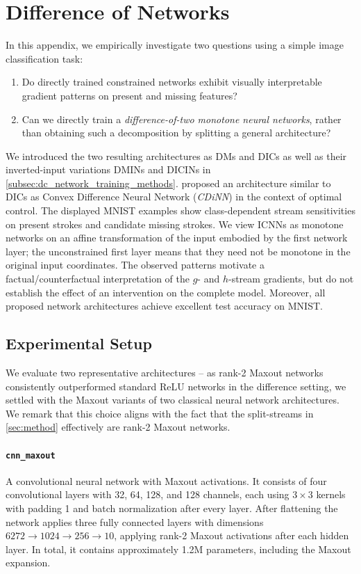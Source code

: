 \section{Difference of Networks}
\label{app:explaining_io_convex_nns}

In this appendix, we empirically investigate two questions using a simple image classification task:
\begin{enumerate}
    \item[(A)] Do directly trained constrained networks exhibit visually interpretable gradient patterns on present and missing features?
    \item[(B)] Can we directly train a \emph{difference-of-two monotone neural networks}, rather than obtaining such a decomposition by splitting a general architecture? 
\end{enumerate}

We introduced the two resulting architectures as DMs and DICs as well as their inverted-input variations DMINs and DICINs in \cref{subsec:dc_network_training_methods}.  proposed an architecture similar to DICs as Convex Difference Neural Network (\emph{CDiNN}) in the context of optimal control.
The displayed MNIST examples show class-dependent stream sensitivities on present strokes and candidate missing strokes. We view ICNNs as monotone networks on an affine transformation of the input embodied by the first network layer; the unconstrained first layer means that they need not be monotone in the original input coordinates. The observed patterns motivate a factual/counterfactual interpretation of the $g$- and $h$-stream gradients, but do not establish the effect of an intervention on the complete model.
Moreover, all proposed network architectures achieve excellent test accuracy on MNIST.

\subsection{Experimental Setup} \label{subsec:dic_experiment}

We evaluate two representative architectures -- as rank-2 Maxout networks consistently outperformed standard ReLU networks in the difference setting, we settled with the Maxout variants of two classical neural network architectures. We remark that this choice aligns with the fact that the split-streams in \cref{sec:method} effectively are rank-2 Maxout networks.

\paragraph{\texttt{cnn\_maxout}}
A convolutional neural network with Maxout activations.
It consists of four convolutional layers with 32, 64, 128, and 128 channels, each using $3\times3$ kernels with padding 1 and batch normalization after every layer.
After flattening the network applies three fully connected layers with dimensions $6272 \rightarrow 1024 \rightarrow 256 \rightarrow 10$, applying rank-2 Maxout activations after each hidden layer.
In total, it contains approximately 1.2M parameters, including the Maxout expansion.

